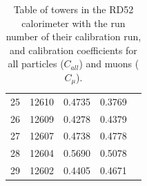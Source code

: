 \begin{table}[hp]
\begin{tabular}{ c c c c c}
	25 & 12610 & 0.4735 & 0.3769 \\
	26 & 12609 & 0.4278 & 0.4379 \\
	27 & 12607 & 0.4738 & 0.4778 \\
	28 & 12604 & 0.5690 & 0.5078 \\
	29 & 12602 & 0.4405 & 0.4671 \\ \hline \hline
	\end{tabular}
	\caption{Table of towers in the RD52 calorimeter with the run number of their calibration run, and calibration coefficients for all particles ($C_{all}$) and muons ($C_{\mu}$).}
	\label{table:idea/calibrationruns}
\end{table}


